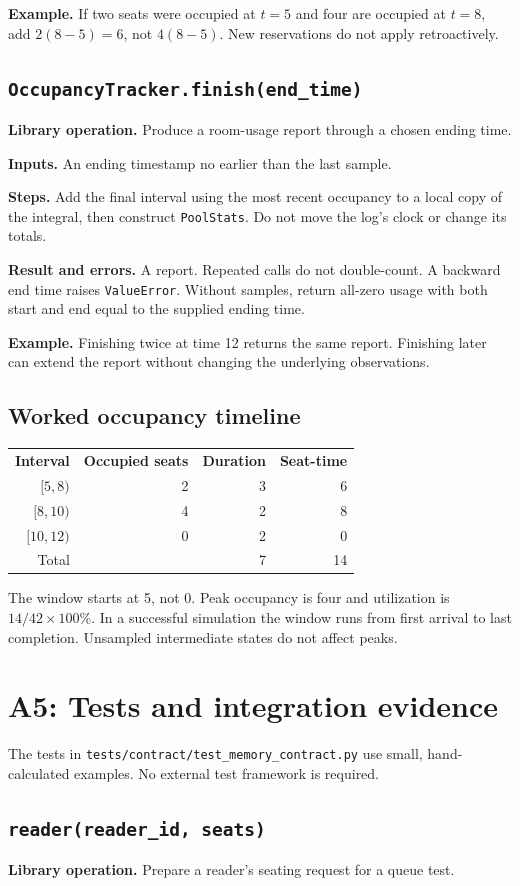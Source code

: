 \documentclass[11pt,a4paper]{article}
\newcommand{\routine}[2]{\subsection{\texorpdfstring{\texttt{#1}}{#2}}}
\newcommand{\librarymeaning}{\textbf{Library operation.} }
\newcommand{\arguments}{\textbf{Inputs.} }
\newcommand{\steps}{\textbf{Steps.} }
\newcommand{\result}{\textbf{Result and errors.} }
\newcommand{\example}{\textbf{Example.} }
\begin{document}
\example If two seats were occupied at $t=5$ and four are occupied at $t=8$,
add $2(8-5)=6$, not $4(8-5)$. New reservations do not apply retroactively.

\routine{OccupancyTracker.finish(end\_time)}{OccupancyTracker finish}
\librarymeaning Produce a room-usage report through a chosen ending time.

\arguments An ending timestamp no earlier than the last sample.

\steps Add the final interval using the most recent occupancy to a local
copy of the integral, then construct \texttt{PoolStats}. Do not move the log's
clock or change its totals.

\result A report. Repeated calls do not double-count. A backward end time
raises \texttt{ValueError}. Without samples, return all-zero usage with both
start and end equal to the supplied ending time.

\example Finishing twice at time 12 returns the same report. Finishing
later can extend the report without changing the underlying observations.

\subsection{Worked occupancy timeline}
\begin{center}
\begin{tabular}{rrrr}
\textbf{Interval} & \textbf{Occupied seats} & \textbf{Duration} & \textbf{Seat-time} \\
$[5,8)$ & 2 & 3 & 6 \\
$[8,10)$ & 4 & 2 & 8 \\
$[10,12)$ & 0 & 2 & 0 \\
\hline
Total & & 7 & 14
\end{tabular}
\end{center}
The window starts at 5, not 0. Peak occupancy is four and utilization is
$14/42\times100\%$. In a successful simulation the window runs from first
arrival to last completion. Unsampled intermediate states do not affect peaks.

\section{A5: Tests and integration evidence}

The tests in \texttt{tests/contract/test\_memory\_contract.py} use small,
hand-calculated examples. No external test framework is required.

\routine{reader(reader\_id, seats)}{Test reader helper}
\librarymeaning Prepare a reader's seating request for a queue test.
\end{document}

